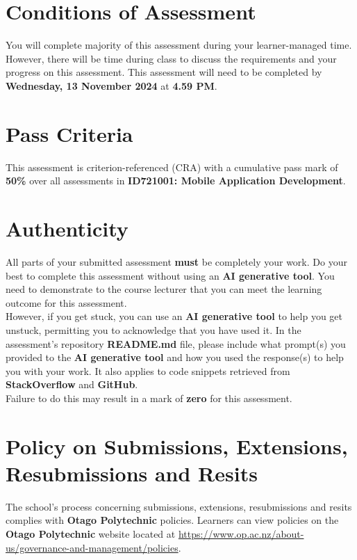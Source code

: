 \documentclass{article}
\begin{document}
\section*{Conditions of Assessment}
You will complete majority of this assessment during your learner-managed time. However, there will be time during class to discuss the requirements and your progress on this assessment. This assessment will need to be completed by \textbf{Wednesday, 13 November 2024} at \textbf{4.59 PM}.

\section*{Pass Criteria}
This assessment is criterion-referenced (CRA) with a cumulative pass mark of \textbf{50\%} over all assessments in \textbf{ID721001: Mobile Application Development}.

\section*{Authenticity}
All parts of your submitted assessment \textbf{must} be completely your work. Do your best to complete this assessment without using an \textbf{AI generative tool}. You need to demonstrate to the course lecturer that you can meet the learning outcome for this assessment. \\
 
 However, if you get stuck, you can use an \textbf{AI generative tool} to help you get unstuck, permitting you to acknowledge that you have used it. In the assessment's repository \textbf{README.md} file, please include what prompt(s) you provided to the \textbf{AI generative tool} and how you used the response(s) to help you with your work. It also applies to code snippets retrieved from \textbf{StackOverflow} and \textbf{GitHub}. \\
 
 Failure to do this may result in a mark of \textbf{zero} for this assessment.

\section*{Policy on Submissions, Extensions, Resubmissions and Resits}
The school's process concerning submissions, extensions, resubmissions and resits complies with \textbf{Otago Polytechnic} policies. Learners can view policies on the \textbf{Otago Polytechnic} website located at \href{https://www.op.ac.nz/about-us/governance-and-management/policies}{https://www.op.ac.nz/about-us/governance-and-management/policies}.
\end{document}
